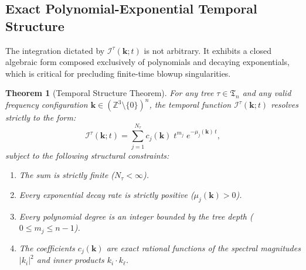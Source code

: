 \documentclass[12pt,a4paper]{article}
\theoremstyle{plain}
\newtheorem{theorem}{Theorem}[section]
\theoremstyle{definition}
\theoremstyle{remark}
\newcommand{\Z}{\mathbb{Z}}
\newcommand{\II}{\mathcal{I}}
\newcommand{\fT}{\mathfrak{T}}
\begin{document}
\subsection{Exact Polynomial-Exponential Temporal Structure}
\label{subsec:temporal_structure}

The integration dictated by $\II^\tau(\mathbf{k};t)$ is not arbitrary. It exhibits a closed algebraic form composed exclusively of polynomials and decaying exponentials, which is critical for precluding finite-time blowup singularities.

\begin{theorem}[Temporal Structure Theorem]
\label{thm:PE}
For any tree $\tau\in\fT_n$ and any valid frequency configuration $\mathbf{k}\in(\Z^3\setminus\{0\})^n$, the temporal function $\II^\tau(\mathbf{k};t)$ resolves strictly to the form:
\[
  \II^\tau(\mathbf{k};t)
  =
  \sum_{j=1}^{N_\tau} c_j(\mathbf{k})\;t^{m_j}\;e^{-\mu_j(\mathbf{k})\,t},
\]
subject to the following structural constraints:
\begin{enumerate}[label=(\alph*)]
  \item The sum is strictly finite ($N_\tau < \infty$).
  \item Every exponential decay rate is strictly positive ($\mu_j(\mathbf{k}) > 0$).
  \item Every polynomial degree is an integer bounded by the tree depth ($0\le m_j \le n-1$).
  \item The coefficients $c_j(\mathbf{k})$ are exact rational functions of the spectral magnitudes $|k_i|^2$ and inner products $k_i\cdot k_\ell$.
\end{enumerate}
\end{theorem}
\end{document}
